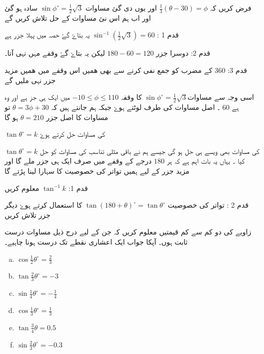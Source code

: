 فرض کریں کہ \( \frac{1}{3}\left(\theta-30\right) = \phi \) اور یوں دی گئ مساوات \( \sin\phi^{\circ}=\frac{1}{2}\sqrt{3} \)  سادہ ہو گئ اور اب ہم اس نئ مساوات کے حل تلاش کریں گے

قدم 1 : \( \sin^{-1}\left(\frac{1}{2}\sqrt{3}\right)=60 \) یہ بتاۓ گۓ حصہ میں پہلا جزر ہے

قدم 2: دوسرا جزر  \( 180-60=120 \) لیکن یہ بتاۓ گۓ وقفے مہں نہی آتا۔ 

قدم 3: \( 360 \)  کے مضرب کو جمع نفی کرنے سے بھی ھمیں اس وقفے میں ھمیں مزید جزر نہی ملیں گے 

اسی وجہ سے مساوات\( \sin\phi^{\circ}=\frac{1}{2}\sqrt{3} \)   کا وقفہ \( -10\leqslant\phi\leqslant110 \) میں ایک ہی جز ہے اور وہ ہے \( 60 \) ۔ اصل مساوات کی طرف لوٹتے ہوۓ جبکہ ہم جانتے ہیں کہ \( \theta = 3\phi+30 \) تو مساوات کا اصل  جزر \( \theta =210 \)  ہو گا 

\( \tan\theta^{\circ}=k \) کی مساوات حل کرتے ہوۓ

\( \tan\theta^{\circ}=k \) کی مساوات بھی ویسے ہی حل ہو گی جیسے ہم نے باقی مثلی تناسب کی مساوات کو حل کیا ۔ یہاں یہ بات اہم ہے کہ ہر  \( 180 \) درجے کے وقفے میں صرف ایک ہی جزر  ملے گا اور مزید جزر کے لیے ہمیں تواتر کی خصوصیت کا سہارا لینا پڑتے گا

قدم 1: \( \tan^{-1}k \) معلوم کریں

قدم 2 : تواتر کی خصوصیت \( \tan\left(180+\theta\right)^{\circ}=\tan\theta^{\circ} \)  کا استعمال کرتے ہوۓ دیگر جزر تلاش کریں









زاویے کی دو کم سے کم قیمتیں معلوم کریں کہ جن کے لیے درج ذیل مساوات درست ثابت ہوں۔ آپکا جواب ایک اعشاری نقطے تک درست ہونا چاہیے۔
\begin{multicols}{3}
\begin{enumerate}[a.]
\item \( \cos\frac{1}{2}\theta^{\circ}=\frac{2}{3} \) 
\item \( \tan\frac{2}{3}\theta^{\circ}=-3 \) 
\item \( \sin\frac{1}{4}\theta^{\circ}=-\frac{1}{4} \) 
\item \( \cos\frac{1}{3}\theta^{\circ}=\frac{1}{3} \) 
\item \( \tan\frac{3}{4}\theta=0.5 \) 
\item \( \sin\frac{2}{3}\theta^{\circ}=-0.3 \) 
\end{enumerate}
\end{multicols}


